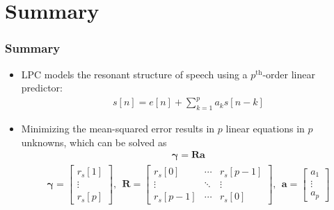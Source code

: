 \documentclass{beamer}
\begin{document}
\section{Summary}

\begin{frame}
  \frametitle{Summary}

  \begin{itemize}
  \item LPC models the resonant structure of speech using a
    $p^{\text{th}}$-order linear predictor:
    \begin{align*}
      s[n] = e[n]+\sum_{k=1}^p a_k s[n-k]
    \end{align*}
  \item Minimizing the mean-squared error results in $p$ linear
    equations in $p$ unknowns, which can be solved as
    \begin{align*}
      \boldsymbol{\gamma}=\mathbf{R}\mathbf{a}
    \end{align*}
    \begin{align*}
      \boldsymbol{\gamma}=\left[\begin{array}{c}r_s[1]\\\vdots\\r_s[p]\end{array}\right],~~
      \mathbf{R}=\left[\begin{array}{ccc}r_s[0]&\cdots&r_s[p-1]\\
          \vdots&\ddots&\vdots\\r_s[p-1]&\cdots&r_s[0]\end{array}\right],~~
      \mathbf{a}=\left[\begin{array}{c}a_1\\\vdots\\a_p\end{array}\right]
    \end{align*}
  \end{itemize}
\end{frame}
\end{document}
